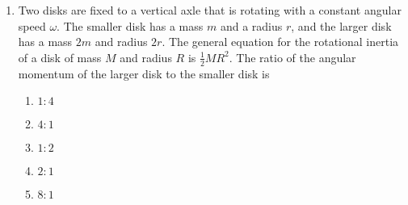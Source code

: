 \documentclass{../../../oss-apphys}
\begin{document}
\begin{multicols}{2}
\begin{enumerate}[leftmargin=18pt]
  \item Two disks are fixed to a vertical axle that is rotating with a constant
    angular speed $\omega$. The smaller disk has a mass $m$ and a radius $r$,
    and the larger disk has a mass $2m$ and radius $2r$. The general equation
    for the rotational inertia of a disk of mass $M$ and radius $R$ is
    $\frac12MR^2$. The ratio of the angular momentum of the larger disk to
    the smaller disk is
    \begin{center}
    \end{center}
    \begin{enumerate}[noitemsep,topsep=0pt,leftmargin=18pt,label=(\Alph*)]
    \item$1:4$
    \item$4:1$
    \item$1:2$
    \item$2:1$
    \item$8:1$
    \end{enumerate}
    \columnbreak
    
%    
    

\end{enumerate}
\end{multicols}
\end{document}
